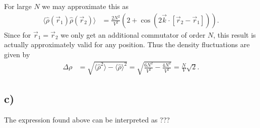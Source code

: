 \documentclass[english, parskip=full]{scrartcl}
\newcommand{\bra}{}
\newcommand{\kla}{}
\begin{document}
For large $N$ we may approximate this as 
\begin{align}
\bra\langle \hat{\rho}(\vec{r}_1) \hat{\rho}(\vec{r}_2) \rangle &=  \frac{2N^2}{V^2} \kla\left( 2 + \cos\kla\left( 2\vec{k}\cdot [\vec{r}_2 - \vec{r}_1] \right) \right).
\end{align}
Since for $\vec{r}_1 = \vec{r}_2$ we only get an additional commutator of order $N$, this result is actually approximately valid for any position.
Thus the density fluctuations are given by
\begin{align}
\Delta \rho &= \sqrt{\bra\langle \hat{\rho}^2 \rangle - \bra\langle \hat{\rho} \rangle^2} = \sqrt{\frac{6N^2}{V^2} - \frac{4N^2}{V^2}} = \frac{N}{V} \sqrt{2}.
\end{align}


\subsection*{c)}

The expression found above can be interpreted as ???



\newpage
\end{document}
